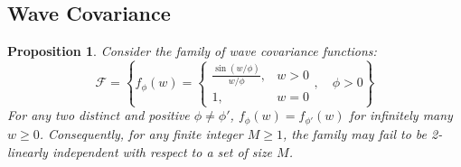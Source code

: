 \documentclass[11pt]{article}
\newtheorem{proposition}{Proposition}
\theoremstyle{definition}
\theoremstyle{remark}
\begin{document}
\subsection{Wave Covariance}

\begin{proposition}\label{prop:wave-cov-not-k-distinguishable} 
Consider the family of wave covariance functions:
\[\mathcal{F} =\left\{ f_\phi(w) = \begin{cases} \frac{\sin (w/\phi)}{w/\phi}, & w > 0\\
1, & w = 0
\end{cases}, \quad \phi > 0\right\}\]
For any two distinct and positive $\phi\neq \phi'$, $f_{\phi}(w) = f_{\phi'}(w)$ for infinitely many $w\ge 0$. Consequently, for any finite integer $M\ge 1$, the family may fail to be 2-linearly independent with respect to a set of size $M$.
\end{proposition}
\end{document}
